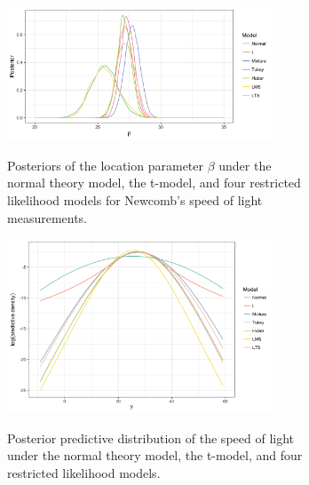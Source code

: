 \documentclass[11pt]{article}
\begin{document}
\begin{figure}
\centering
\begin{subfigure}{.45\textwidth}
{\includegraphics[width = 3.1in]{figs/speed_of_light_beta.png}}
\caption{Posteriors of the location parameter $\beta$ under the normal theory model, the t-model, and four restricted likelihood models for Newcomb's speed of light measurements.}
\label{fig:newcomb_beta}
\end{subfigure}
\begin{subfigure}{.45\textwidth}
\centering
{\includegraphics[width = 3.1in]{figs/speed_of_light_predictive.png}}
\caption{Posterior predictive distribution of the speed of light under the normal theory model, the t-model, and four restricted likelihood models.}
\label{fig:newcomb_predictive}
\end{subfigure}
\caption{}
\end{figure}
\end{document}
